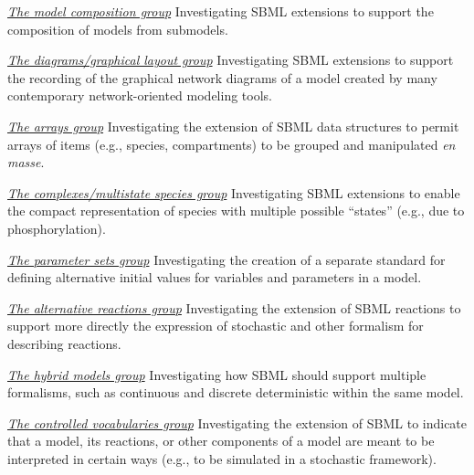 \documentclass{sbmlfaq}
\begin{document}
\begin{description}
\item \href{http://www.mpi-magdeburg.mpg.de/zlocal/martins/sbml-comp/}
{\emph{The model composition group}}
  Investigating SBML extensions to support the composition of models from submodels.

\item \href{http://caboy.uchc.edu/wagner/Science/VirtualCell/SBML-DWG/Default.htm}
{\emph{The diagrams/graphical layout group}}
  Investigating SBML extensions to support the recording of the graphical network
  diagrams of a model created by many contemporary network-oriented
  modeling tools.

\item \href{http://www.sbw-sbml.org/sbml-discuss/archive/msg00166.html}
{\emph{The arrays group}}
  Investigating the extension of SBML data structures to permit arrays of items
  (e.g., species, compartments) to be grouped and manipulated \emph{en
    masse}.

\item \href{http://www.sbw-sbml.org/sbml-discuss/archive/msg00174.html}
{\emph{The complexes/multistate species group}}
  Investigating SBML extensions to enable the compact representation of species
  with multiple possible ``states'' (e.g., due to phosphorylation).

\item \href{http://www.sbw-sbml.org/sbml-discuss/archive/msg00423.html}
{\emph{The parameter sets group}}
  Investigating the creation of a separate standard for defining alternative initial
  values for variables and parameters in a model.
  
\item \href{http://www.sbw-sbml.org/sbml-discuss/archive/msg00235.html}
{\emph{The alternative reactions group}}
  Investigating the extension of SBML reactions to
  support more directly the expression of stochastic and other formalism for
  describing reactions.
  
\item \href{http://www.sbw-sbml.org/sbml-discuss/archive/msg00466.html}
  {\emph{The hybrid models group}} Investigating how SBML should support
  multiple formalisms, such as continuous and discrete deterministic
  within the same model.
  
\item \href{http://www.sbw-sbml.org/sbml-discuss/archive/msg00510.html}
{\emph{The controlled vocabularies group}}
Investigating the extension of SBML to 
  indicate that a model, its reactions, or other components of a model
  are meant to be interpreted in certain ways (e.g., to be simulated in a
  stochastic framework).


\end{description}
\end{document}
